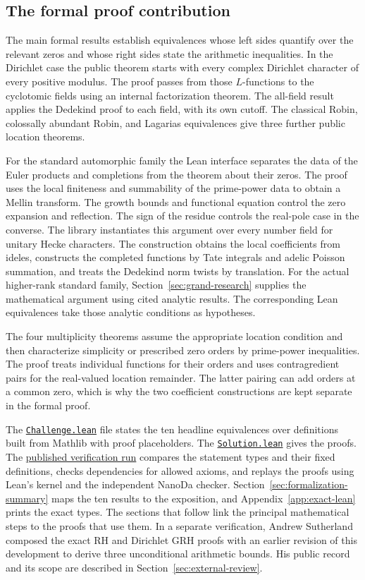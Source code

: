 \documentclass[11pt]{amsart}
\theoremstyle{definition}
\theoremstyle{remark}
\numberwithin{equation}{section}
\newcommand{\repositoryurl}{https://github.com/kimihiro64/Robin1984}
\newcommand{\proofrevision}{b359826e62c50b6cef55db4b2fcab793232498cc}
\newcommand{\codefile}[1]{%
  \href{\repositoryurl/blob/\proofrevision/#1}{\nolinkurl{#1}}}
\newcommand{\runlink}[2]{%
  \href{\repositoryurl/actions/runs/#1}{#2}}
\begin{document}
\subsection{The formal proof contribution}\label{sec:lean-contribution}

The main formal results establish equivalences whose left sides
quantify over the relevant zeros and whose right sides state the
arithmetic inequalities. In the Dirichlet case the public theorem
starts with every complex Dirichlet character of every positive
modulus. The proof passes from those \(L\)-functions to the cyclotomic
fields using an internal factorization theorem. The all-field result
applies the Dedekind proof to each field, with its own cutoff. The
classical Robin, colossally abundant Robin, and Lagarias equivalences
give three further public location theorems.

For the standard automorphic family the Lean interface separates the
data of the Euler products and completions from the theorem about
their zeros. The proof uses the local finiteness and summability of
the prime-power data to obtain a Mellin transform. The growth bounds and functional equation control the zero
expansion and reflection. The sign of the residue controls the
real-pole case in the converse. The library instantiates this argument over every number
field for unitary Hecke characters. The construction obtains the
local coefficients from ideles, constructs the completed functions
by Tate integrals and adelic Poisson summation, and treats the
Dedekind norm twists by translation. For the actual higher-rank
standard family, Section~\ref{sec:grand-research} supplies the
mathematical argument using cited analytic results. The corresponding
Lean equivalences take those analytic conditions as hypotheses.

The four multiplicity theorems assume the appropriate location
condition and then characterize simplicity or prescribed zero
orders by prime-power inequalities. The proof treats individual
functions for their orders and uses contragredient pairs for the
real-valued location remainder. The latter pairing can add orders
at a common zero, which is why the two coefficient constructions
are kept separate in the formal proof.

The \codefile{Challenge.lean} file states the ten headline equivalences
over definitions built from Mathlib with proof placeholders.
The \codefile{Solution.lean} gives the proofs. The
\runlink{45793028032}{published verification run} compares the
statement types and their fixed definitions, checks dependencies
for allowed axioms, and replays the proofs using Lean's kernel
and the independent NanoDa checker. Section~\ref{sec:formalization-summary}
maps the ten results to the exposition, and
Appendix~\ref{app:exact-lean} prints the exact types. The sections
that follow link the principal mathematical steps to the proofs
that use them. In a separate verification, Andrew Sutherland
composed the exact RH and Dirichlet GRH proofs with an earlier
revision of this development to derive three unconditional
arithmetic bounds. His public record and its scope are described
in Section~\ref{sec:external-review}.
\end{document}
